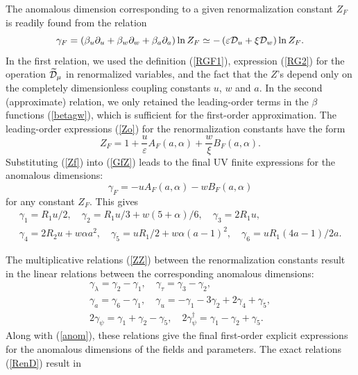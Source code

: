 \documentclass[12pt]{article}
\def\Dm{\widetilde{\cal D}_{\mu}}
\def\D{{\cal D}}
\begin{document}
The anomalous dimension corresponding to a given renormalization constant
$Z_{F}$ is readily found from the relation
\begin{equation}
\gamma_{F} = \left( \beta_{u}\partial_{u}+\beta_{w}\partial_{w}
+\beta_{a}\partial_{a} \right)
\ln Z_{F} \simeq  - \left(\varepsilon\D_{u}+\xi\D_{w}\right) \ln Z_{F}.
\label{GfZ}
\end{equation}
In the first relation, we used the definition (\ref{RGF1}), expression
(\ref{RG2}) for the operation $\Dm$ in renormalized variables, and the
fact that the $Z$'s depend only on the completely dimensionless coupling
constants $u$, $w$ and $a$. In the second (approximate) relation, we only
retained the leading-order terms in the $\beta$ functions (\ref{betagw}),
which is sufficient for the first-order approximation. The leading-order
expressions (\ref{Zo}) for the renormalization constants have
the form
\begin{equation}
Z_{F} = 1 + \frac{u}{\varepsilon} A_{F}(a,\alpha) + \frac{w}{\xi} B_{F}(a,\alpha).
\label{Zf}
\end{equation}
Substituting (\ref{Zf}) into (\ref{GfZ}) leads to the final UV finite
expressions for the anomalous dimensions:
\begin{equation}
\gamma_{F} = - u A_{F}(a,\alpha) - w B_{F}(a,\alpha)
\label{gift}
\end{equation}
for any constant $Z_{F}$. This gives
\begin{eqnarray}
\gamma_{1} = R_{1}u/2 , \quad \gamma_{2} = R_{1}u/3 + w (5+\alpha)/6, \quad
\gamma_{3} = 2R_{1}u , \nonumber \\
\gamma_{4} = 2R_{2}u + w \alpha a^{2}, \quad
\gamma_{5} = uR_{1}/2 + w \alpha (a-1)^{2}, \quad
\gamma_{6} =uR_{1}(4a-1)/2a.
\label{anom}
\end{eqnarray}


The multiplicative relations (\ref{ZZ})
between the renormalization constants result in the linear relations
between the corresponding anomalous dimensions:
\begin{eqnarray}
\gamma_{\lambda} =  \gamma_{2} -\gamma_{1}, \quad
\gamma_{\tau} =  \gamma_{3} -\gamma_{2} , \nonumber \\
\gamma_{a} =  \gamma_{6} -\gamma_{1}, \quad
\gamma_{u} = -\gamma_{1}- 3\gamma_{2} +2\gamma_{4} + \gamma_{5}, \\ \nonumber
2\gamma_{\psi}= \gamma_{1} +\gamma_{2} -\gamma_{5}, \quad
2\gamma_{\psi}^{\dag}= \gamma_{1} - \gamma_{2} + \gamma_{5}.
\label{aesoC}
\end{eqnarray}
Along with (\ref{anom}), these
relations give the final
first-order explicit expressions for the anomalous dimensions of the
fields and parameters. The exact relations (\ref{RenD}) result in
\end{document}
